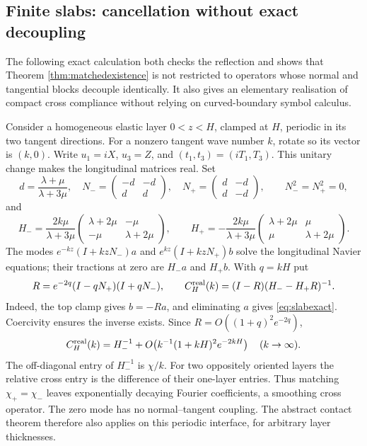 \documentclass[11pt,a4paper]{article}
\theoremstyle{definition}\newtheorem{definition}[theorem]{Definition}
\theoremstyle{remark}\newtheorem{remark}[theorem]{Remark}
\numberwithin{equation}{section}
\begin{document}
\subsection{Finite slabs: cancellation without exact decoupling}\label{sec:slabcompliance}
The following exact calculation both checks the reflection and shows that Theorem \ref{thm:matchedexistence} is not restricted to operators whose normal and tangential blocks decouple identically. It also gives an elementary realisation of compact cross compliance without relying on curved-boundary symbol calculus.

Consider a homogeneous elastic layer $0<z<H$, clamped at $H$, periodic in its two tangent directions. For a nonzero tangent wave number $k$, rotate so its vector is $(k,0)$. Write $u_1=iX$, $u_3=Z$, and $(t_1,t_3)=(iT_1,T_3)$. This unitary change makes the longitudinal matrices real. Set
\[
 d=\frac{\lambda+\mu}{\lambda+3\mu},\quad
 N_-=\begin{pmatrix}-d&-d\\ d&d\end{pmatrix},\quad
 N_+=\begin{pmatrix}d&-d\\ d&-d\end{pmatrix},\qquad N_-^2=N_+^2=0,
\]
and
\[
 H_-=\frac{2k\mu}{\lambda+3\mu}
   \begin{pmatrix}\lambda+2\mu&-\mu\\-\mu&\lambda+2\mu\end{pmatrix},\qquad
 H_+=-\frac{2k\mu}{\lambda+3\mu}
   \begin{pmatrix}\lambda+2\mu&\mu\\\mu&\lambda+2\mu\end{pmatrix}.
\]
The modes $e^{-kz}(I+kzN_-)a$ and $e^{kz}(I+kzN_+)b$ solve the longitudinal Navier equations; their tractions at zero are $H_-a$ and $H_+b$. With $q=kH$ put
\begin{equation}\label{eq:slabexact}
 R=e^{-2q}(I-qN_+)(I+qN_-),\qquad
 C_H^{\rm real}(k)=(I-R)(H_--H_+R)^{-1}.
\end{equation}
Indeed, the top clamp gives $b=-Ra$, and eliminating $a$ gives \eqref{eq:slabexact}. Coercivity ensures the inverse exists. Since $R=O((1+q)^2e^{-2q})$,
\begin{equation}\label{eq:slabasymp}
 C_H^{\rm real}(k)=H_-^{-1}
             +O\!\left(k^{-1}(1+kH)^2e^{-2kH}\right)
             \quad(k\to\infty).
\end{equation}
The off-diagonal entry of $H_-^{-1}$ is $\chi/k$. For two oppositely oriented layers the relative cross entry is the difference of their one-layer entries. Thus matching $\chi_+=\chi_-$ leaves exponentially decaying Fourier coefficients, a smoothing cross operator. The zero mode has no normal--tangent coupling. The abstract contact theorem therefore also applies on this periodic interface, for arbitrary layer thicknesses.
\end{document}
